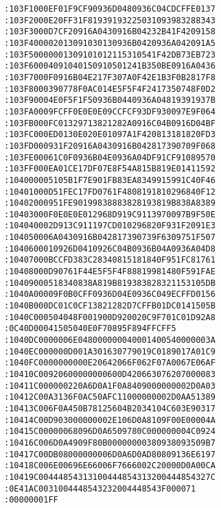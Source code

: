 \begin{lstlisting}[language={}, basicstyle=\scriptsize, caption=Машинний код]
:103F1000EF01F9CF90936D0480936C04CDCFFE0137
:103F2000E20FF31F81939193225031093983288343
:103F3000D7CF20916A0430916B04232B41F4209158
:103F400002013091030130936B0420936A042091A5
:103F50000001309101012115310541F42DB73EB723
:103F60004091040150910501241B350BE0916A0436
:103F7000F0916B04E217F307A0F42E1B3F0B2817F8
:103F8000390778F0AC014E5F5F4F2417350748F0D2
:103F90004E0F5F1F50936B0440936A04819391937B
:103FA0009FCFF0E0E0E09CCFCF93DF930097E9F064
:103FB000FC01329713821282A0916C04B0916D04BF
:103FC000ED0130E020E01097A1F420813181820FD3
:103FD000931F20916A0430916B042817390709F068
:103FE00061C0F0936B04E0936A04DF91CF91089570
:103FF000EA01CE17DF07E8F54A815B819E01411592
:104000005105B1F7E901FB83EA8349915991C40F46
:10401000D51FEC17FD0761F4808191810296840F12
:10402000951FE90199838883828193819B838A8389
:10403000F0E0E0E012968D919C9113970097B9F50E
:104040002D913C911197CD010296820F931F2091E3
:104050006A0430916B042817390739F6309751F507
:1040600010926D0410926C04B0936B04A0936A04D8
:10407000BCCFD383C28340815181840F951FC81761
:10408000D90761F44E5F5F4F88819981480F591FAE
:10409000518340838A819B819383828321153105DB
:1040A00009F0B0CFF0936D04E0936C049ECFFD0156
:1040B000DC01C0CF13821282D7CFFB01DC0141505B
:1040C000504048F001900D920020C9F701C01D92A8
:0C40D00041505040E0F70895F894FFCFF5
:1040DC0000006E048000000040001400540000003A
:1040EC000000D001A301630779019C0189017A01C9
:1040FC0000000000E20642066F062F07A0067E06AF
:10410C00920600000000600D420663076207000083
:10411C000000220A6D0A1F0A8409000000002D0A03
:10412C00A3136F0AC50AFC11000000002D0AA51389
:10413C006F0A450B78125604B2034104C603E90317
:10414C00D903000000002E106D0A8109F00E00004A
:10415C00000068096D0A6509780C000000004C0924
:10416C006D0A4909F80B00000000380938093509B7
:10417C00DB08000000006D0A6D0AD80809136E6197
:10418C006E00696E66006F7666002C20000D0A00CA
:10419C00444854313100444854313200444854327C
:0E41AC0031004448543232004448543F000071
:00000001FF
\end{lstlisting}
